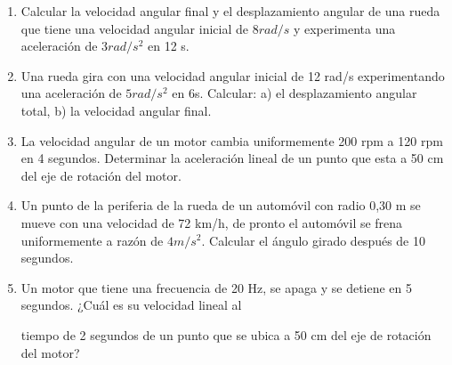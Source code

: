 \begin{enumerate}
\item Calcular la  velocidad  angular  final  y  el desplazamiento  angular de  una  rueda  que  tiene una velocidad angular 
inicial de $8 rad/s$ y experimenta una aceleración de $3 rad/s^2$ en 12 s.

\item Una  rueda  gira  con  una  velocidad  angular inicial  de  12  rad/s  experimentando  una  aceleración de $5 rad/s^2$ en 
6s. Calcular: a) el desplazamiento angular total, b) la velocidad angular final.

\item La velocidad angular de un motor cambia uniformemente 200 rpm a 120 rpm en 4 segundos. Determinar la aceleración lineal de 
un punto que esta a 50 cm del eje de rotación del motor.

\item Un punto de la periferia de la rueda de un automóvil con radio 0,30 m  se mueve con una velocidad de 72 km/h, de pronto el 
automóvil se frena uniformemente a razón de $4 m/s^2$.  Calcular  el ángulo girado  después de 10 segundos.

\item  Un motor que tiene 
una frecuencia de 20 Hz, se apaga y se detiene en 5 segundos. ¿Cuál es su velocidad lineal al 

tiempo de 2 segundos de un punto que se ubica a 50 cm del eje de rotación del motor?

\end{enumerate}
